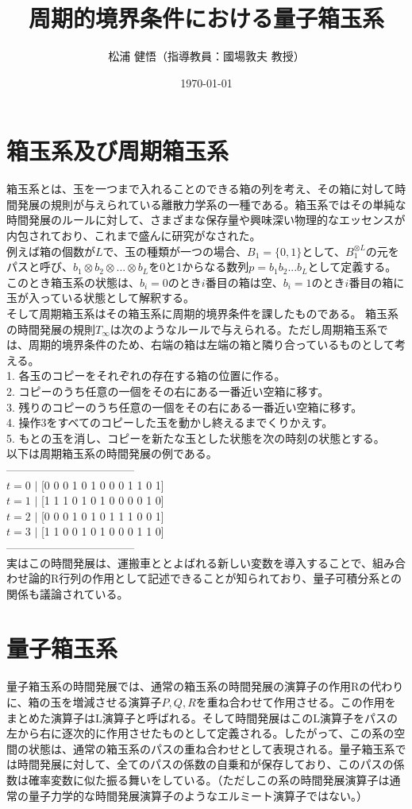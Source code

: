 \documentclass[twocolumn,10pt]{jarticle}
\title{周期的境界条件における量子箱玉系}
\author{松浦 健悟（指導教員：國場敦夫 教授）}
\date{\today}
\begin{document}
\maketitle
\thispagestyle{empty}
\section{箱玉系及び周期箱玉系}
箱玉系とは、玉を一つまで入れることのできる箱の列を考え、その箱に対して時間発展の規則が与えられている離散力学系の一種である。箱玉系ではその単純な時間発展のルールに対して、さまざまな保存量や興味深い物理的なエッセンスが内包されており、これまで盛んに研究がなされた。\\
例えば箱の個数が$L$で、玉の種類が一つの場合、$B_1 = \{ 0, 1\}$として、$B_1 ^ {\otimes L}$の元をパスと呼び、$b_1 \otimes b_2 \otimes ... \otimes b_L $を0と1からなる数列$p = b_1 b_2 ... b_L $として定義する。このとき箱玉系の状態は、$b_i = 0$のとき$i$番目の箱は空、$b_i = 1$のとき$i$番目の箱に玉が入っている状態として解釈する。\\そして周期箱玉系はその箱玉系に周期的境界条件を課したものである。
箱玉系の時間発展の規則$T_\infty$は次のようなルールで与えられる。ただし周期箱玉系では、周期的境界条件のため、右端の箱は左端の箱と隣り合っているものとして考える。\\
1. 各玉のコピーをそれぞれの存在する箱の位置に作る。\\  
2. コピーのうち任意の一個をその右にある一番近い空箱に移す。\\  
3. 残りのコピーのうち任意の一個をその右にある一番近い空箱に移す。\\  
4. 操作3をすべてのコピーした玉を動かし終えるまでくりかえす。\\  
5. もとの玉を消し、コピーを新たな玉とした状態を次の時刻の状態とする。\\  
以下は周期箱玉系の時間発展の例である。\\  
-----------------------------------\\  
$t = 0$ $|$ [0 0 0 1 0 1 0 0 0 1 1 0 1]\\  
$t = 1$ $|$ [1 1 1 0 1 0 1 0 0 0 0 1 0]\\
$t = 2$ $|$ [0 0 0 1 0 1 0 1 1 1 0 0 1]\\
$t = 3$ $|$ [1 1 0 0 1 0 1 0 0 0 1 1 0]\\
-----------------------------------\\
実はこの時間発展は、運搬車ととよばれる新しい変数を導入することで、組み合わせ論的R行列の作用として記述できることが知られており、量子可積分系との関係も議論されている。
\section{量子箱玉系}
量子箱玉系の時間発展では、通常の箱玉系の時間発展の演算子の作用Rの代わりに、箱の玉を増減させる演算子$P,Q,R$を重ね合わせて作用させる。この作用をまとめた演算子はL演算子と呼ばれる。そして時間発展はこのL演算子をパスの左から右に逐次的に作用させたものとして定義される。したがって、この系の空間の状態は、通常の箱玉系のパスの重ね合わせとして表現される。量子箱玉系では時間発展に対して、全てのパスの係数の自乗和が保存しており、このパスの係数は確率変数に似た振る舞いをしている。（ただしこの系の時間発展演算子は通常の量子力学的な時間発展演算子のようなエルミート演算子ではない。）
\end{document}
